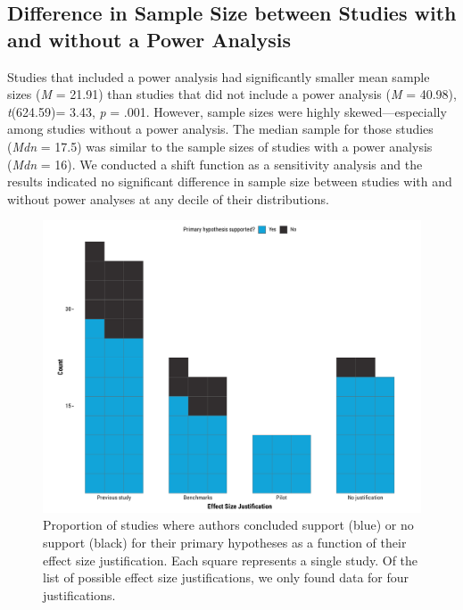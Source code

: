 \documentclass[
  doc, donotrepeattitle,floatsintext]{apa7}
\begin{document}
\hypertarget{difference-in-sample-size-between-studies-with-and-without-a-power-analysis}{%
\subsection{Difference in Sample Size between Studies with and without a Power Analysis}\label{difference-in-sample-size-between-studies-with-and-without-a-power-analysis}}

Studies that included a power analysis had significantly smaller mean sample sizes (\emph{M} = 21.91) than studies that did not include a power analysis (\emph{M} = 40.98), \emph{t}(624.59)= 3.43, \emph{p} = .001. However, sample sizes were highly skewed---especially among studies without a power analysis. The median sample for those studies (\emph{Mdn} = 17.5) was similar to the sample sizes of studies with a power analysis (\emph{Mdn} = 16). We conducted a shift function as a sensitivity analysis and the results indicated no significant difference in sample size between studies with and without power analyses at any decile of their distributions.

\pagebreak

\begin{figure}

{\centering \includegraphics{../../figs/fig3} 

}

\caption{Proportion of studies where authors concluded support (blue) or no support (black) for their primary hypotheses as a function of their effect size justification. Each square represents a single study. Of the list of possible effect size justifications, we only found data for four justifications.}\label{fig:fig3}
\end{figure}
\end{document}
